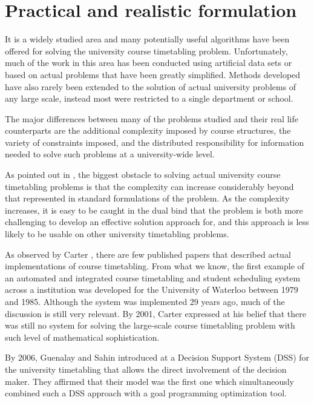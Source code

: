 \section{Practical and realistic formulation}

It is a widely studied area and many potentially useful algorithms have been offered for solving the university course timetabling problem. Unfortunately, much of the work in this area has been conducted using artificial data sets or based on actual problems that have been greatly simplified. Methods developed have also rarely been extended to the solution of actual university problems of any large scale, instead most were restricted to a single department or school.

The major differences between many of the problems studied and their real life counterparts are the additional complexity imposed by course structures, the variety of constraints imposed, and the distributed responsibility for information needed to solve such problems at a university-wide level.

As pointed out in \cite{Murray2007}, the biggest obstacle to solving actual university course timetabling problems is that the complexity can increase considerably beyond that represented in standard formulations of the problem. As the complexity increases, it is easy to be caught in the dual bind that the problem is both more challenging to develop an effective solution approach for, and this approach is less likely to be usable on other university timetabling problems.

As observed by Carter \cite{Carter2001}, there are few published papers that described actual implementations of course timetabling. From what we know, the first example of an automated and integrated course timetabling and student scheduling system across a institution was developed for the University of Waterloo between 1979 and 1985. Although the system was implemented 29 years ago, much of the discussion is still very relevant. By 2001, Carter expressed at \cite{Carter2001} his belief that there was still no system for solving the large-scale course timetabling problem with such level of mathematical sophistication.

By 2006, Guenalay and Sahin introduced at \cite{Guenalay2006} a Decision Support System (DSS) for the university timetabling that allows the direct involvement of the decision maker. They affirmed that their model was the first one which simultaneously combined such a DSS approach with a goal programming optimization tool.

